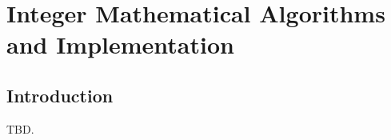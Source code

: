 \chapter{Integer Mathematical Algorithms and Implementation}        
\label{cmal0}

\section{Introduction}
\label{cmal0:sint0}

TBD.


